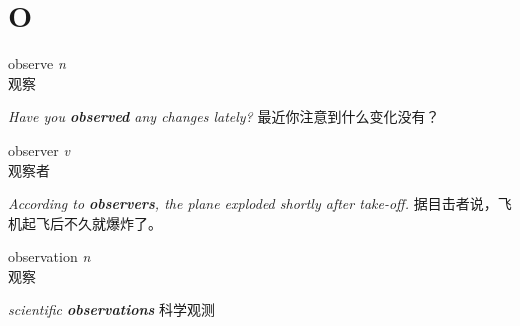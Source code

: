 \section{O}

\item[] {
    \lettrine{observe}{}  
    \textit{n} 
    \\
    观察

    \textit{Have you \textbf{observed} any changes lately?}
    最近你注意到什么变化没有？

}

\item[] {
    \lettrine{observer}{}  
    \textit{v} 
    \\
    观察者

    \textit{According to \textbf{observers}, the plane exploded shortly after take-off. }
    据目击者说，飞机起飞后不久就爆炸了。

}

\item[] {
    \lettrine{observation}{}  
    \textit{n} 
    \\
    观察

    \textit{scientific \textbf{observations}}
    科学观测

}